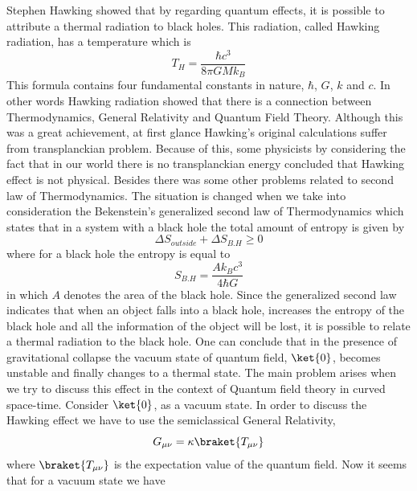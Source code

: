 \documentclass[12pt,a4paper]{article}
\begin{document}
Stephen Hawking \cite{Hawking:1974rv} showed that by regarding quantum effects, it is possible to attribute a thermal radiation to black holes. This radiation, called Hawking radiation, has a temperature which is
\begin{equation}\label{eqn.hawking.temp}
   T_{H}=\frac{\hbar c^3}{8\pi G M k_{B}}
\end{equation}
This formula contains four fundamental constants in nature, $ \hbar$, $G$, $k$ and $c $. In other words Hawking radiation showed that there is a connection between Thermodynamics, General Relativity and Quantum Field Theory. Although this was a great achievement, at first glance Hawking's original calculations suffer from transplanckian problem. Because of this, some physicists by considering the fact that in our world there is no transplanckian energy concluded that Hawking effect is not physical. Besides there was some other problems related to second law of Thermodynamics. The situation is changed when we take into consideration the Bekenstein's generalized second law of Thermodynamics \cite{Bekenstein} which states that in a system with a black hole the total amount of entropy is given by
\begin{equation}\label{eqn.bekenstein}
 \Delta S_{outside} + \Delta S_{B.H} \geq 0
\end{equation}
where for a black hole the entropy is equal to
\begin{equation}\label{eqn.entropy. beken}
 S_{B.H}=\frac{A k_B c^3}{4\hbar G}
\end{equation}
in which $A$ denotes the area of the black hole.
Since the generalized second law indicates that when an object falls into a black hole, increases the entropy of the black hole and all the information of the object will be lost, it is possible to relate a thermal radiation to the black hole. One can conclude that in the presence of gravitational collapse the vacuum state of quantum field, $ \ket {0} $, becomes unstable and finally changes to a thermal state.
The main problem arises when we try to discuss this effect in the context of Quantum field theory in curved space-time.
Consider $\ket{0}$, as a vacuum state. In order to discuss the Hawking effect we have to use the semiclassical General Relativity,
\begin{equation}\label{eqn.semiclassic}
G_{\mu\nu}=\kappa\braket{T_{\mu\nu}}
\end{equation}
where $\braket{T_{\mu\nu}}$ is the expectation value of the quantum field. Now it seems that for a vacuum state we have
\end{document}

